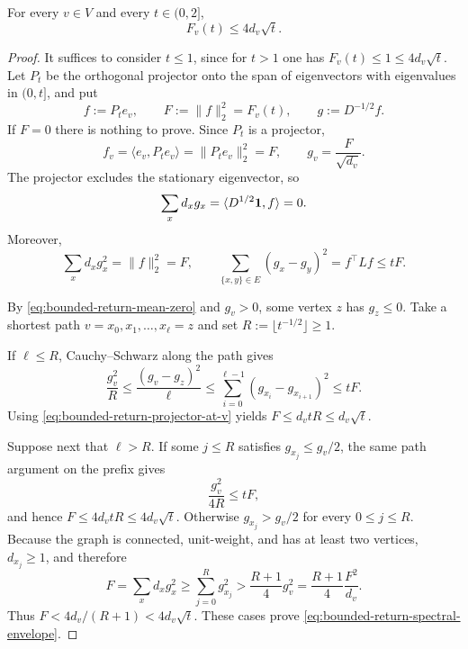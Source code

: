 \documentclass[11pt]{article}
\begin{document}
\begin{lemma}
\label{lem:bounded-return-spectral-measure}
For every $v\in V$ and every $t\in(0,2]$,
\begin{equation}
 F_v(t)\le4d_v\sqrt t.
 \label{eq:bounded-return-spectral-envelope}
\end{equation}
\end{lemma}

\begin{proof}
It suffices to consider $t\le1$, since for $t>1$ one has
$F_v(t)\le1\le4d_v\sqrt t$.  Let $P_t$ be the orthogonal projector onto the
span of eigenvectors with eigenvalues in $(0,t]$, and put
\[
 f:=P_te_v,
 \qquad F:=\|f\|_2^2=F_v(t),
 \qquad g:=D^{-1/2}f.
\]
If $F=0$ there is nothing to prove.  Since $P_t$ is a projector,
\begin{equation}
 f_v=\langle e_v,P_te_v\rangle=\|P_te_v\|_2^2=F,
 \qquad
 g_v=\frac{F}{\sqrt{d_v}}.
 \label{eq:bounded-return-projector-at-v}
\end{equation}
The projector excludes the stationary eigenvector, so
\begin{equation}
 \sum_xd_xg_x=\langle D^{1/2}\mathbf{1},f\rangle=0.
 \label{eq:bounded-return-mean-zero}
\end{equation}
Moreover,
\begin{equation}
 \sum_xd_xg_x^2=\|f\|_2^2=F,
 \qquad
 \sum_{\{x,y\}\in E}(g_x-g_y)^2
 =f^\top Lf\le tF.
 \label{eq:bounded-return-norm-energy}
\end{equation}

By \eqref{eq:bounded-return-mean-zero} and $g_v>0$, some vertex $z$ has
$g_z\le0$.  Take a shortest path
$v=x_0,x_1,\ldots,x_{\ell}=z$ and set
$R:=\lfloor t^{-1/2}\rfloor\ge1$.

If $\ell\le R$, Cauchy--Schwarz along the path gives
\[
 \frac{g_v^2}{R}
 \le\frac{(g_v-g_z)^2}{\ell}
 \le\sum_{i=0}^{\ell-1}(g_{x_i}-g_{x_{i+1}})^2
 \le tF.
\]
Using \eqref{eq:bounded-return-projector-at-v} yields
$F\le d_vtR\le d_v\sqrt t$.

Suppose next that $\ell>R$.  If some $j\le R$ satisfies
$g_{x_j}\le g_v/2$, the same path argument on the prefix gives
\[
 \frac{g_v^2}{4R}\le tF,
\]
and hence $F\le4d_vtR\le4d_v\sqrt t$.  Otherwise
$g_{x_j}>g_v/2$ for every $0\le j\le R$.  Because the graph is connected,
unit-weight, and has at least two vertices, $d_{x_j}\ge1$, and therefore
\[
 F=\sum_xd_xg_x^2
 \ge\sum_{j=0}^{R}g_{x_j}^2
 >\frac{R+1}{4}g_v^2
 =\frac{R+1}{4}\frac{F^2}{d_v}.
\]
Thus $F<4d_v/(R+1)<4d_v\sqrt t$.  These cases prove
\eqref{eq:bounded-return-spectral-envelope}.
\end{proof}
\end{document}
